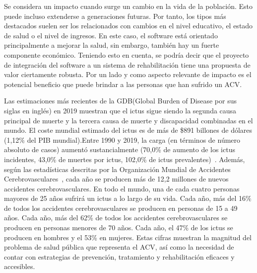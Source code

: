 
Se considera un impacto cuando surge un cambio en la vida de la población. Esto puede incluso extenderse a generaciones futuras. Por tanto, los tipos más destacados suelen ser los relacionados con cambios en el nivel educativo, el estado de salud o el nivel de ingresos. En este caso, el software está orientado principalmente a mejorar la salud, sin embargo, también hay un fuerte componente económico. Teniendo esto en cuenta, se podría decir que el proyecto de integración del software a un sistema de rehabilitación tiene una propuesta de valor ciertamente robusta. Por un lado y como aspecto relevante de impacto es el potencial beneficio que puede brindar a las personas que han sufrido un ACV. 

Las estimaciones más recientes de la GDB(Global Burden of Disease por sus siglas en inglés) en 2019 muestran que el ictus sigue siendo la segunda causa principal de muerte y la tercera causa de muerte y discapacidad combinadas en el mundo. El coste mundial estimado del ictus es de más de \$891 billones de dólares (1,12\% del PIB mundial).Entre 1990 y 2019, la carga (en términos de número absoluto de casos) aumentó sustancialmente (70,0\% de aumento de los ictus incidentes, 43,0\% de muertes por ictus, 102,0\% de ictus prevalentes)~\cite{feigin2022world}. Además, según las estadísticas descritas por la Organización Mundial de Accidentes Cerebrovasculares~\cite{lindsay2019world}, cada año se producen más de 12,2 millones de nuevos accidentes cerebrovasculares. En todo el mundo, una de cada cuatro personas mayores de 25 años sufrirá un ictus a lo largo de su vida. Cada año, más del 16\% de todos los accidentes cerebrovasculares se producen en personas de 15 a 49 años. Cada año, más del 62\% de todos los accidentes cerebrovasculares se producen en personas menores de 70 años. Cada año, el 47\% de los ictus se producen en hombres y el 53\% en mujeres. Estas cifras muestran la magnitud del problema de salud pública que representa el ACV, así como la necesidad de contar con estrategias de prevención, tratamiento y rehabilitación eficaces y accesibles. 

